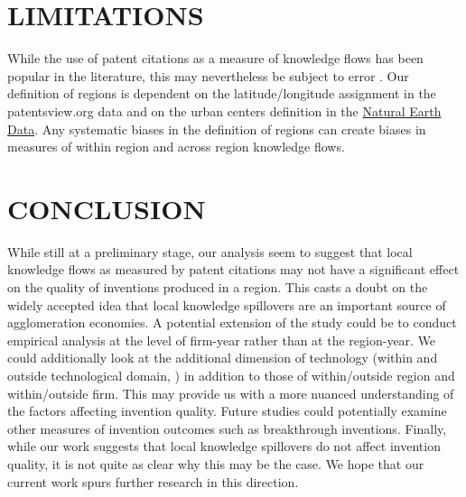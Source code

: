 \documentclass[parskip=full,11pt,letterpaper]{article}
\begin{document}
\section*{LIMITATIONS}
While the use of patent citations as a measure of knowledge flows has been popular in the literature, this may nevertheless be subject to error \citep*{Arora2017a}. Our definition of regions is dependent on the latitude/longitude assignment in the patentsview.org data and on the urban centers definition in the \href{http://www.naturalearthdata.com/downloads/10m-cultural-vectors/}{Natural Earth Data}. Any systematic biases in the definition of regions can create biases in measures of within region and across region knowledge flows. \par

\section*{CONCLUSION}
While still at a preliminary stage, our analysis seem to suggest that local knowledge flows as measured by patent citations may not have a significant effect on the quality of inventions produced in a region. This casts a doubt on the widely accepted idea that local knowledge spillovers are an important source of agglomeration economies. A potential extension of the study could be to conduct empirical analysis at the level of firm-year rather than at the region-year. We could additionally look at the additional dimension of technology (within and outside technological domain, \cite{Rosenkopf2001}) in addition to those of within/outside region and within/outside firm. This may provide us with a more nuanced understanding of the factors affecting invention quality. Future studies could potentially examine other measures of invention outcomes such as breakthrough inventions. Finally, while our work suggests that local knowledge spillovers do not affect invention quality, it is not quite as clear why this may be the case. We hope that our current work spurs further research in this direction.  

\singlespacing
\small
\renewcommand{\refname}{REFERENCES}
 



\scriptsize

\end{document}
